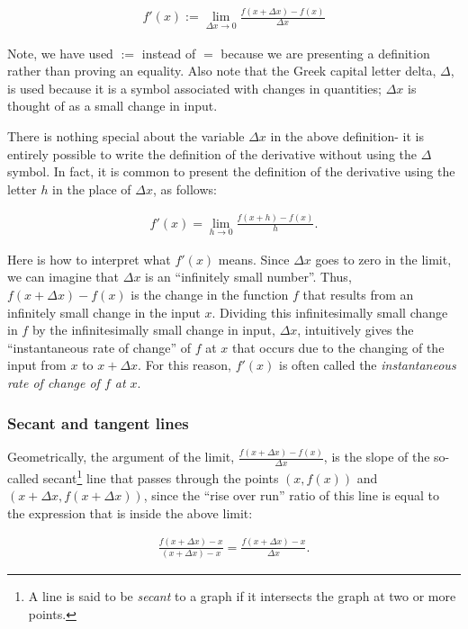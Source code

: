 \begin{align*}
     \boxed
     {
        f'(x) := \lim_{\Delta x \rightarrow 0} \frac{f(x + \Delta x) - f(x)}{\Delta x}
     }
\end{align*}

Note, we have used $:=$ instead of $=$ because we are presenting a definition rather than proving an equality. Also note that the Greek capital letter delta, $\Delta$, is used because it is a symbol associated with changes in quantities; $\Delta x$ is thought of as a small change in input. 

There is nothing special about the variable $\Delta x$ in the above definition- it is entirely possible to write the definition of the derivative without using the $\Delta$ symbol. In fact, it is common to present the definition of the derivative using the letter $h$ in the place of $\Delta x$, as follows:

\begin{align*}
    f'(x) = \lim_{h \rightarrow 0} \frac{f(x + h) - f(x)}{h}.
\end{align*}

Here is how to interpret what $f'(x)$ means. Since $\Delta x$ goes to zero in the limit, we can imagine that $\Delta x$ is an ``infinitely small number''. Thus, $f(x + \Delta x) - f(x)$ is the change in the function $f$ that results from an infinitely small change in the input $x$. Dividing this infinitesimally small change in $f$ by the infinitesimally small change in input, $\Delta x$, intuitively gives the ``instantaneous rate of change'' of $f$ at $x$ that occurs due to the changing of the input from $x$ to $x + \Delta x$. For this reason, $f'(x)$ is often called the \textit{instantaneous rate of change of $f$ at $x$}.

\subsubsection*{Secant and tangent lines}

Geometrically, the argument of the limit, $\frac{f(x + \Delta x) - f(x)}{\Delta x}$, is the slope of the so-called secant\footnote{A line is said to be \textit{secant} to a graph if it intersects the graph at two or more points.} line that passes through the points $(x, f(x))$ and $(x + \Delta x, f(x + \Delta x))$, since the ``rise over run'' ratio of this line is equal to the expression that is inside the above limit:

\begin{align*}
    \frac{f(x + \Delta x) - x}{(x + \Delta x) - x} = \frac{f(x + \Delta x) - x}{\Delta x}.
\end{align*}


